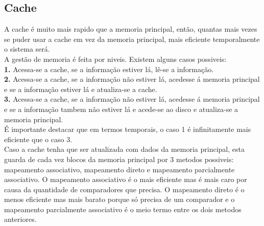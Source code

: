 \documentclass[a4paper, 11pt, onecolumn, oneside]{scrartcl}
\begin{document}
\subsection{Cache}
A cache é muito mais rapido que a memoria principal, então, quantas mais vezes se puder usar a cache em vez da memoria principal, mais eficiente temporalmente o sistema será.\\
A gestão de memoria é feita por niveis. Existem alguns casos possiveis:\\
\textbf{1.} Acessa-se a cache, se a informação estiver lá, lê-se a informação.\\
\textbf{2.} Acessa-se a cache, se a informação não estiver lá, acedesse á memoria principal e se a informação estiver lá e atualiza-se a cache.\\ 
\textbf{3.} Acessa-se a cache, se a informação não estiver lá, acedesse á memoria principal e se a informação tambem não estiver lá e acede-se ao disco e atualiza-se a memoria principal.\\ 
É importante destacar que em termos temporais, o caso 1 é infinitamente mais eficiente que o caso 3.\\
Caso a cache tenha que ser atualizada com dados da memoria principal, esta guarda de cada vez blocos da memoria principal por 3 metodos possiveis: mapeamento associativo, 
mapeamento direto e mapeamento parcialmente associativo. O mapeamento associativo é o mais eficiente mas é mais caro por causa da quantidade de comparadores que precisa. 
O mapeamento direto é o menos eficiente mas mais barato porque só precisa de um comparador e o mapeamento parcialmente associativo é o meio termo entre os dois metodos anteriores.
\end{document}
